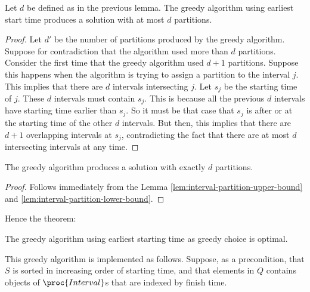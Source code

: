 \begin{lemma} \label{lem:interval-partition-lower-bound}
    Let $d$ be defined as in the previous lemma. The greedy algorithm using earliest start time produces a solution with at most $d$ partitions.
\end{lemma}

\begin{proof}
    Let $d'$ be the number of partitions produced by the greedy algorithm. Suppose for contradiction that the algorithm used more than $d$ partitions. Consider the first time that the greedy algorithm used $d+1$ partitions. Suppose this happens when the algorithm is trying to assign a partition to the interval $j$. This implies that there are $d$ intervals intersecting $j$. Let $s_j$ be the starting time of $j$. These $d$ intervals must contain $s_j$. This is because all the previous $d$ intervals have starting time earlier than $s_j$. So it must be that case that $s_j$ is after or at the starting time of the other $d$ intervals. But then, this implies that there are $d+1$ overlapping intervals at $s_j$, contradicting the fact that there are at most $d$ intersecting intervals at any time.
\end{proof}

\begin{corollary}
    The greedy algorithm produces a solution with exactly $d$ partitions.
\end{corollary}

\begin{proof}
    Follows immediately from the Lemma \ref{lem:interval-partition-upper-bound} and \ref{lem:interval-partition-lower-bound}.
\end{proof}

Hence the theorem:

\begin{theorem}
    The greedy algorithm using earliest starting time as greedy choice is optimal.
\end{theorem}

This greedy algorithm is implemented as follows. Suppose, as a precondition, that $S$ is sorted in increasing order of starting time, and that elements in $Q$ contains objects of $\proc{Interval}$s that are indexed by finish time.

